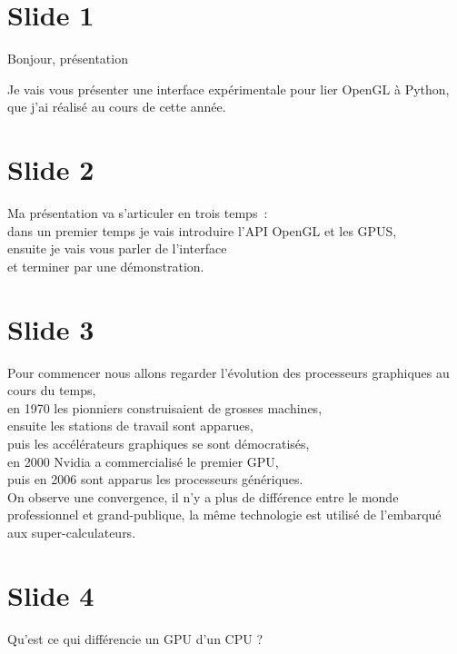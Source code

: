 \documentclass[12pt]{article}
\begin{document}
\section{Slide 1}

\noindent%
Bonjour, présentation

\noindent%
Je vais vous présenter une interface expérimentale pour lier OpenGL à Python, \\
que j'ai réalisé au cours de cette année.

\section{Slide 2}

\noindent%
Ma présentation va s'articuler en trois temps~: \\
  dans un premier temps je vais introduire l'API OpenGL et les GPUS, \\
  ensuite je vais vous parler de l'interface \\
  et terminer par une démonstration.

\section{Slide 3}

\noindent%
Pour commencer nous allons regarder l'évolution des processeurs graphiques au cours du temps, \\

\noindent%
en 1970 les pionniers construisaient de grosses machines, \\
ensuite les stations de travail sont apparues, \\
puis les accélérateurs graphiques se sont démocratisés, \\
en 2000 Nvidia a commercialisé le premier GPU, \\
puis en 2006 sont apparus les processeurs génériques. \\

\noindent%
On observe une convergence, il n'y a plus de différence entre le monde professionnel et grand-publique,
la même technologie est utilisé de l'embarqué aux super-calculateurs.

\section{Slide 4}

\noindent%
Qu'est ce qui différencie un GPU d'un CPU ? \\
\end{document}
